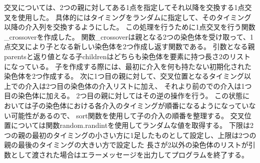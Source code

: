 交叉については、2つの親に対してある1点を指定してそれ以降を交換する1点交叉を使用した。
具体的にはタイミングをランダムに指定して、そのタイミング以降の介入列を交換するようにした。
この処理を行うために1点交叉を行う関数\_crossoverを作成した。
関数\_crossoverは親となる2つの染色体を受け取って、1点交叉により子となる新しい染色体を2つ作成し返す関数である。
引数となる親parentsと返り値となる子childrenはどちらも染色体を要素に持つ長さ2のリストになっている。
子を作成する際には、最初に介入を何も持たない初期化された染色体を2つ作成する。
次に1つ目の親に対して、交叉位置となるタイミング以上での介入は2つ目の染色体の介入リストに加え、
それより前のでの介入は1つ目の染色体に加える。
2つ目の親に対してはその逆の操作を行う。
この状態においては子の染色体における各介入のタイミングが順番になるようになっていない可能性があるので、
sort関数を使用して子の介入の順番を整理する。
交叉位置については関数random.randintを使用してランダムな値を取得する。
下限は2つの親の最初のタイミングの小さい方に1足したものとして設定し、上限は2つの親の最後のタイミングの大きい方で設定した
長さが2以外の染色体のリストが引数として渡された場合はエラーメッセージを出力してプログラムを終了する。
